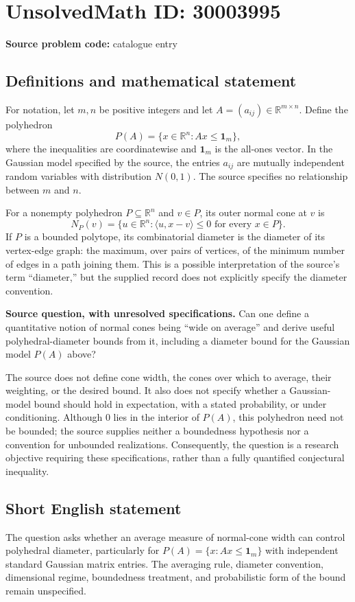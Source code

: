 \documentclass[11pt]{article}
\newcommand{\R}{\mathbb{R}}
\begin{document}
\section*{UnsolvedMath ID: 30003995}
\textbf{Source problem code:} catalogue entry
\subsection{Definitions and mathematical statement}
For notation, let \(m,n\) be positive integers and let \(A=(a_{ij})\in\R^{m\times n}\). Define the polyhedron
\[
P(A)=\{x\in\R^n:Ax\leq\mathbf 1_m\},
\]
where the inequalities are coordinatewise and \(\mathbf 1_m\) is the all-ones vector. In the Gaussian model specified by the source, the entries \(a_{ij}\) are mutually independent random variables with distribution \(N(0,1)\). The source specifies no relationship between \(m\) and \(n\).

For a nonempty polyhedron \(P\subseteq\R^n\) and \(v\in P\), its outer normal cone at \(v\) is
\[
N_P(v)=\{u\in\R^n:\langle u,x-v\rangle\leq 0\text{ for every }x\in P\}.
\]
If \(P\) is a bounded polytope, its combinatorial diameter is the diameter of its vertex-edge graph: the maximum, over pairs of vertices, of the minimum number of edges in a path joining them. This is a possible interpretation of the source's term ``diameter,'' but the supplied record does not explicitly specify the diameter convention.

\textbf{Source question, with unresolved specifications.} Can one define a quantitative notion of normal cones being ``wide on average'' and derive useful polyhedral-diameter bounds from it, including a diameter bound for the Gaussian model \(P(A)\) above?

The source does not define cone width, the cones over which to average, their weighting, or the desired bound. It also does not specify whether a Gaussian-model bound should hold in expectation, with a stated probability, or under conditioning. Although \(0\) lies in the interior of \(P(A)\), this polyhedron need not be bounded; the source supplies neither a boundedness hypothesis nor a convention for unbounded realizations. Consequently, the question is a research objective requiring these specifications, rather than a fully quantified conjectural inequality.
\subsection{Short English statement}
The question asks whether an average measure of normal-cone width can control polyhedral diameter, particularly for \(P(A)=\{x:Ax\leq\mathbf 1_m\}\) with independent standard Gaussian matrix entries. The averaging rule, diameter convention, dimensional regime, boundedness treatment, and probabilistic form of the bound remain unspecified.
\end{document}
